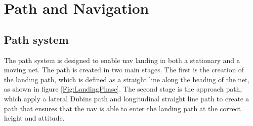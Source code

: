 \chapter{Path and Navigation}
\section{Path system}\label{Ch:LandingPath}
The path system is designed to enable \gls{uav} landing in both a stationary and a moving net. The path is created in two main stages. The first is the creation of the landing path, which is defined as a straight line along the heading of the net, as shown in figure \ref{Fig:LandingPhase}. The second stage is the approach path, which apply a lateral Dubins path and longitudinal straight line path to create a path that ensures that the \gls{uav} is able to enter the landing path at the correct height and attitude.
